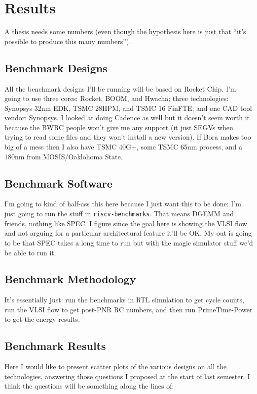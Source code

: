 \documentclass{article}
\begin{document}
\chapter{Results}

A thesis needs some numbers (even though the hypothesis here is just that
``it's possible to produce this many numbers'').

\section{Benchmark Designs}

All the benchmark designs I'll be running will be based on Rocket Chip.  I'm
going to use three cores: Rocket, BOOM, and Hwacha; three technologies:
Synopsys 32nm EDK, TSMC 28HPM, and TSMC 16 FinFTE; and one CAD tool vendor:
Synopsys.  I looked at doing Cadence as well but it doesn't seem worth it
because the BWRC people won't give me any support (it just SEGVs when trying to
read some files and they won't install a new version).  If Bora makes too big
of a mess then I also have TSMC 40G+, some TSMC 65nm process, and a 180nm from
MOSIS/Oaklohoma State.

\section{Benchmark Software}

I'm going to kind of half-ass this here because I just want this to be done:
I'm just going to run the stuff in \texttt{riscv-benchmarks}.  That means DGEMM
and friends, nothing like SPEC.  I figure since the goal here is showing the
VLSI flow and not arguing for a particular architectural feature it'll be OK.
My out is going to be that SPEC takes a long time to run but with the magic
simulator stuff we'd be able to run it.

\section{Benchmark Methodology}

It's essentially just: run the benchmarks in RTL simulation to get cycle
counts, run the VLSI flow to get post-PNR RC numbers, and then run
PrimeTime-Power to get the energy results.

\section{Benchmark Results}

Here I would like to present scatter plots of the various designs on all the
technologies, answering those questions I proposed at the start of last
semester.  I think the questions will be something along the lines of:
\end{document}
